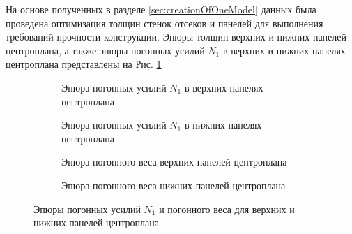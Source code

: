 На основе полученных в разделе \ref{sec:creationOfOneModel} данных была проведена оптимизация толщин стенок отсеков и панелей для выполнения требований прочности конструкции. Эпюры толщин верхних и нижних панелей центроплана, а также эпюры погонных усилий $N_1$ в верхних и нижних панелях центроплана представлены на Рис. \ref{fig:epures}

\begin{figure}[H]
\centering
\captionsetup{justification=centering}
\begin{subfigure}[b]{0.49\textwidth}
	\centering
	\def\svgwidth{\textwidth}
	\footnotesize
		
	\normalsize
	\caption{Эпюра погонных усилий $N_1$ в верхних панелях центроплана}
\end{subfigure}
\begin{subfigure}[b]{0.49\textwidth}
	\centering
	\def\svgwidth{\textwidth}
	
	\caption{Эпюра погонных усилий $N_1$ в нижних панелях центроплана}
\end{subfigure}
\begin{subfigure}[b]{0.49\textwidth}
	\centering
	\def\svgwidth{\textwidth}
	
	\caption{Эпюра погонного веса верхних панелей центроплана}
\end{subfigure}
\begin{subfigure}[b]{0.49\textwidth}
	\centering
	\def\svgwidth{\textwidth}		
	\caption{Эпюра погонного веса нижних панелей центроплана}
\end{subfigure}
	\caption{Эпюры погонных усилий $N_1$ и погонного веса для верхних и нижних панелей центроплана}
	\label{fig:epures}
\end{figure}
%
%
%	
%
%	
%
%	





